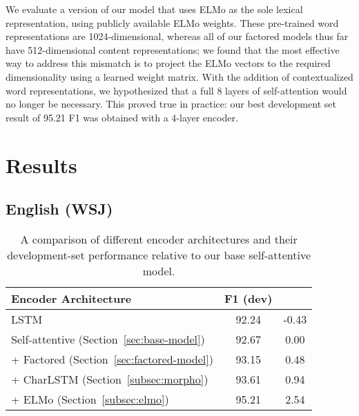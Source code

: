 \documentclass[11pt,a4paper]{article}
\begin{document}
We evaluate a version of our model that uses ELMo as the sole lexical representation, using publicly available ELMo weights. These pre-trained word representations are 1024-dimensional, whereas all of our factored models thus far have 512-dimensional content representations; we found that the most effective way to address this mismatch is to project the ELMo vectors to the required dimensionality using a learned weight matrix. With the addition of contextualized word representations, we hypothesized that a full 8 layers of self-attention would no longer be necessary. This proved true in practice: our best development set result of 95.21 F1 was obtained with a 4-layer encoder.

\section{Results}
\label{sec:results}

\subsection{English (WSJ)}

\begin{table}[t!]
\begin{center}
\begin{tabular}{@{}lcc@{}}
\toprule
Encoder Architecture & F1 (dev) &  \\
\midrule
LSTM \citep{gaddy_analysis_2018} & 92.24 & -0.43 \\
Self-attentive (Section~\ref{sec:base-model}) & 92.67 & \phantom{-}0.00 \\
+ Factored (Section~\ref{sec:factored-model}) & 93.15 & \phantom{-}0.48\\
+ CharLSTM (Section~\ref{subsec:morpho}) & 93.61 & \phantom{-}0.94\\
+ ELMo (Section~\ref{subsec:elmo}) & 95.21 & \phantom{-}2.54\\
\bottomrule
\end{tabular}
\end{center}
\caption{\label{table:wsj-recap} A comparison of different encoder architectures and their development-set performance relative to our base self-attentive model.}
\end{table}
\end{document}
